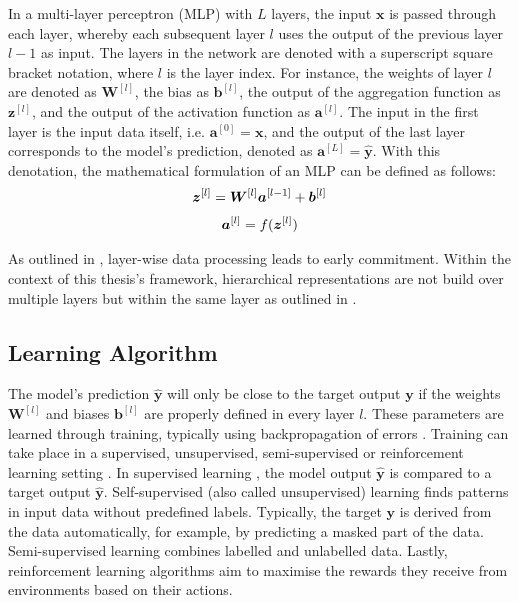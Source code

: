 In a multi-layer perceptron (MLP) with $L$ layers, the input \(\boldsymbol{x}\) is passed through each layer, whereby each subsequent layer \(l\) uses the output of the previous layer \(l-1\) as input.
The layers in the network are denoted with a superscript square bracket notation, where $l$ is the layer index. 
For instance, the weights of layer $l$ are denoted as $\boldsymbol{W}^{[l]}$, the bias as \(\boldsymbol{b}^{[l]}\), the output of the aggregation function as \(\boldsymbol{z}^{[l]}\), and the output of the activation function as \(\boldsymbol{a}^{[l]}\).
The input in the first layer is the input data itself, i.e. $\boldsymbol{a}^{[0]} = \boldsymbol{x}$, and the output of the last layer corresponds to the model's prediction, denoted as $\boldsymbol{a}^{[L]} = \hat{\boldsymbol{y}}$. With this denotation, the mathematical formulation of an MLP can be defined as follows:
%
\begin{align}\eqlbl{mlp}
		\boldsymbol{z}^{[l]} = \boldsymbol{W}^{[l]}\boldsymbol{a}^{[l-1]} + \boldsymbol{b}^{[l]}
\end{align}
%
\begin{align}\eqlbl{mlp2}
		\boldsymbol{a}^{[l]} = f(\boldsymbol{z}^{[l]})
\end{align}

As outlined in , layer-wise data processing leads to early commitment. Within the context of this thesis's framework, hierarchical representations are not build over multiple layers but within the same layer as outlined in .


\subsection{Learning Algorithm}
The model's prediction $\boldsymbol{\hat{y}}$ will only be close to the target output $\boldsymbol{y}$ if the weights $\boldsymbol{W}^{[l]}$ and biases $\boldsymbol{b}^{[l]}$ are properly defined in every layer $l$.
These parameters are learned through training, typically using backpropagation of errors .
Training can take place in a supervised, unsupervised, semi-supervised or reinforcement learning setting \cite{russell_artificial_2021, simmler_survey_2021}. In supervised learning \cite{cord_supervised_2008}, the model output $\boldsymbol{\hat{y}}$ is compared to a target output $\boldsymbol{\hat{y}}$. Self-supervised (also called unsupervised) learning \cite{liu_self-supervised_2021} finds patterns in input data without predefined labels. Typically, the target $\boldsymbol{y}$ is derived from the data automatically, for example, by predicting a masked part of the data. Semi-supervised learning \cite{van_engelen_survey_2020} combines labelled and unlabelled data. Lastly, reinforcement learning algorithms \cite{arulkumaran_deep_2017} aim to maximise the rewards they receive from environments based on their actions.

